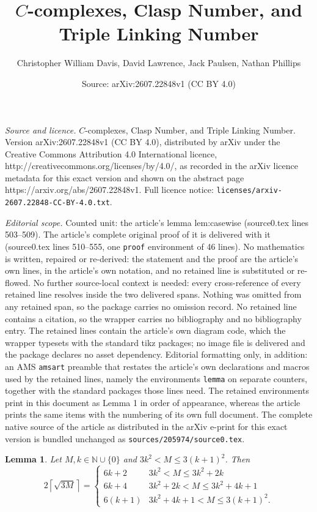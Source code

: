 \documentclass[10pt,a4paper]{amsart}
\title{$C$-complexes, Clasp Number, and Triple Linking Number}
\author{Christopher William Davis, David Lawrence, Jack Paulsen, Nathan Phillips}
\date{Source: arXiv:2607.22848v1 (CC BY 4.0)}
\newtheorem{lemma}{Lemma}
\newcommand{\ceil}[1]{\left\lceil #1 \right\rceil}
\begin{document}
\maketitle

\noindent\emph{Source and licence.} $C$-complexes, Clasp Number, and Triple Linking Number. Version arXiv:2607.22848v1 (CC BY 4.0), distributed by arXiv under the Creative Commons Attribution 4.0 International licence, http://creativecommons.org/licenses/by/4.0/, as recorded in the arXiv licence metadata for this exact version and shown on the abstract page https://arxiv.org/abs/2607.22848v1. Full licence notice: \texttt{licenses/arxiv-2607.22848-CC-BY-4.0.txt}.\par\smallskip

\noindent\textit{Editorial scope.} Counted unit: the article's lemma lem:casewise (source0.tex lines 503--509). The article's complete original proof of it is delivered with it (source0.tex lines 510--555, one \texttt{proof} environment of 46 lines). No mathematics is written, repaired or re-derived: the statement and the proof are the article's own lines, in the article's own notation, and no retained line is substituted or re-flowed.  No further source-local context is needed: every cross-reference of every retained line resolves inside the two delivered spans.  Nothing was omitted from any retained span, so the package carries no omission record.  No retained line contains a citation, so the wrapper carries no bibliography and no bibliography entry.  The retained lines contain the article's own diagram code, which the wrapper typesets with the standard tikz packages; no image file is delivered and the package declares no asset dependency.  Editorial formatting only, in addition: an AMS \texttt{amsart} preamble that restates the article's own declarations and macros used by the retained lines, namely the environments \texttt{lemma} on separate counters, together with the standard packages those lines need.  The retained environments print in this document as Lemma 1 in order of appearance, whereas the article prints the same items with the numbering of its own full document.  The complete native source of the article as distributed in the arXiv e-print for this exact version is bundled unchanged as \texttt{sources/205974/source0.tex}.
\begin{lemma}\label{lem:casewise}
   Let $M,k\in\mathbb{N}\cup\{0\}$ and $3k^2<M\leq3(k+1)^2$.  Then  $$2\ceil{\sqrt{3M}}=\begin{cases}
    6k+2 & 3k^2<M\leq 3k^2+2k \\
    6k+4 & 3k^2+2k<M\leq 3k^2+4k+1 \\
    6(k+1) & 3k^2+4k+1<M\leq 3(k+1)^2.
\end{cases}$$
\end{lemma}
\end{document}
